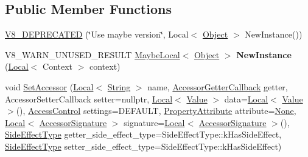 \subsection*{Public Member Functions}
\begin{DoxyCompactItemize}
\item 
\mbox{\hyperlink{classv8_1_1ObjectTemplate_ab13f4f7e5f31fc037f7a72cfbf89443d}{V8\+\_\+\+D\+E\+P\+R\+E\+C\+A\+T\+ED}} (\char`\"{}Use maybe version\char`\"{}, Local$<$ \mbox{\hyperlink{classv8_1_1Object}{Object}} $>$ New\+Instance())
\item 
\mbox{\label{classv8_1_1ObjectTemplate_ab6903ae25b5ffb081f1802df6b7fe6d7}} 
V8\+\_\+\+W\+A\+R\+N\+\_\+\+U\+N\+U\+S\+E\+D\+\_\+\+R\+E\+S\+U\+LT \mbox{\hyperlink{classv8_1_1MaybeLocal}{Maybe\+Local}}$<$ \mbox{\hyperlink{classv8_1_1Object}{Object}} $>$ {\bfseries New\+Instance} (\mbox{\hyperlink{classv8_1_1Local}{Local}}$<$ Context $>$ context)
\item 
void \mbox{\hyperlink{classv8_1_1ObjectTemplate_a5a99dc7b4895ad486430a4ba6c294136}{Set\+Accessor}} (\mbox{\hyperlink{classv8_1_1Local}{Local}}$<$ \mbox{\hyperlink{classv8_1_1String}{String}} $>$ name, \mbox{\hyperlink{namespacev8_a722613c87061708a4f1aa050d095f868}{Accessor\+Getter\+Callback}} getter, Accessor\+Setter\+Callback setter=nullptr, \mbox{\hyperlink{classv8_1_1Local}{Local}}$<$ \mbox{\hyperlink{classv8_1_1Value}{Value}} $>$ data=\mbox{\hyperlink{classv8_1_1Local}{Local}}$<$ \mbox{\hyperlink{classv8_1_1Value}{Value}} $>$(), \mbox{\hyperlink{namespacev8_a31d8355cb043d7d2dda3f4a52760b64e}{Access\+Control}} settings=D\+E\+F\+A\+U\+LT, \mbox{\hyperlink{namespacev8_a05f25f935e108a1ea2d150e274602b87}{Property\+Attribute}} attribute=\mbox{\hyperlink{namespacev8_a05f25f935e108a1ea2d150e274602b87a7ab4d58719c33b3ea2dfaefa29b111df}{None}}, \mbox{\hyperlink{classv8_1_1Local}{Local}}$<$ \mbox{\hyperlink{classv8_1_1AccessorSignature}{Accessor\+Signature}} $>$ signature=\mbox{\hyperlink{classv8_1_1Local}{Local}}$<$ \mbox{\hyperlink{classv8_1_1AccessorSignature}{Accessor\+Signature}} $>$(), \mbox{\hyperlink{namespacev8_a29711319c2b9fc7716d65faee2f7b9cb}{Side\+Effect\+Type}} getter\+\_\+side\+\_\+effect\+\_\+type=Side\+Effect\+Type\+::k\+Has\+Side\+Effect, \mbox{\hyperlink{namespacev8_a29711319c2b9fc7716d65faee2f7b9cb}{Side\+Effect\+Type}} setter\+\_\+side\+\_\+effect\+\_\+type=Side\+Effect\+Type\+::k\+Has\+Side\+Effect)
\item 
\mbox{\label{classv8_1_1ObjectTemplate_ab96a8fcd960c3f5ff358cf1ae2b0b09a}} 

\end{DoxyCompactItemize}
